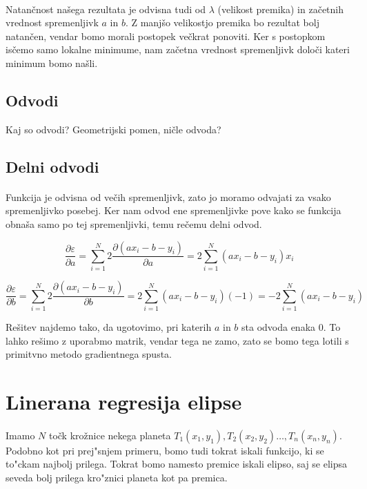 \documentclass[a4paper, 12pt]{article}
\begin{document}
	\paragraph{}
	Natančnost našega rezultata je odvisna tudi od $\lambda$ (velikost premika) in začetnih vrednost spremenljivk $a$ in $b$. Z manjšo velikostjo premika bo rezultat bolj natančen, vendar bomo morali postopek večkrat ponoviti. Ker s postopkom isčemo samo lokalne minimume, nam začetna vrednost spremenljivk določi kateri minimum bomo našli.
	
	\subsection*{Odvodi}
	Kaj so odvodi? Geometrijski pomen, ničle odvoda?
	
	\subsection*{Delni odvodi}
	\paragraph{}
	Funkcija je odvisna od večih spremenljivk, zato jo moramo odvajati za vsako spremenljivko posebej. Ker nam odvod ene spremenljivke pove kako se funkcija obnaša samo po tej spremenljivki, temu rečemu delni odvod.
	
	
	$$\frac{\partial \varepsilon}{\partial a} =
	\sum_{i=1}^{N} 2 \frac{\partial (a x_i - b - y_i)}{\partial a} =
	2 \sum_{i=1}^{N} (a x_i - b - y_i)x_i$$
	
	$$\frac{\partial \varepsilon}{\partial b} =
	\sum_{i=1}^{N} 2 \frac{\partial (a x_i - b - y_i)}{\partial b} =
	2 \sum_{i=1}^{N} (a x_i - b - y_i)(-1) = -2 \sum_{i=1}^{N} (a x_i - b - y_i)$$
	
	Rešitev najdemo tako, da ugotovimo, pri katerih $a$ in $b$ sta odvoda enaka 0. To lahko rešimo z uporabmo matrik, vendar tega ne zamo, zato se bomo tega lotili s primitvno metodo gradientnega spusta.
	
	
	\section*{Linerana regresija elipse}
	\paragraph{}
	Imamo $N$ točk krožnice nekega planeta $T_1(x_1, y_1), T_2(x_2, y_2) \ldots, T_n(x_n, y_n)$. Podobno kot pri prej"snjem primeru, bomo tudi tokrat iskali funkcijo, ki se to"ckam najbolj prilega. Tokrat bomo namesto premice iskali elipso, saj se elipsa seveda bolj prilega kro"znici planeta kot pa premica.
	
\end{document}
